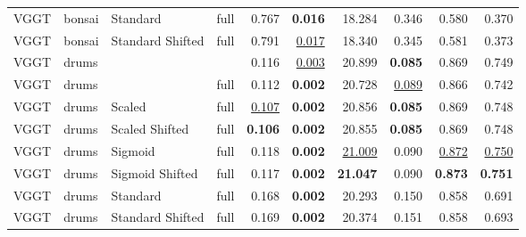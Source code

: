 \begin{table}[H]
\begin{tabular}{llllrrrrrr}
VGGT & bonsai & Standard & full & 0.767 & \textbf{0.016} & 18.284 & 0.346 & 0.580 & 0.370 \\
VGGT & bonsai & Standard Shifted & full & 0.791 & \underline{0.017} & 18.340 & 0.345 & 0.581 & 0.373 \\
\midrule
VGGT & drums &  &  & 0.116 & \underline{0.003} & 20.899 & \textbf{0.085} & 0.869 & 0.749 \\
VGGT & drums &  & full & 0.112 & \textbf{0.002} & 20.728 & \underline{0.089} & 0.866 & 0.742 \\
VGGT & drums & Scaled & full & \underline{0.107} & \textbf{0.002} & 20.856 & \textbf{0.085} & 0.869 & 0.748 \\
VGGT & drums & Scaled Shifted & full & \textbf{0.106} & \textbf{0.002} & 20.855 & \textbf{0.085} & 0.869 & 0.748 \\
VGGT & drums & Sigmoid & full & 0.118 & \textbf{0.002} & \underline{21.009} & 0.090 & \underline{0.872} & \underline{0.750} \\
VGGT & drums & Sigmoid Shifted & full & 0.117 & \textbf{0.002} & \textbf{21.047} & 0.090 & \textbf{0.873} & \textbf{0.751} \\
VGGT & drums & Standard & full & 0.168 & \textbf{0.002} & 20.293 & 0.150 & 0.858 & 0.691 \\
VGGT & drums & Standard Shifted & full & 0.169 & \textbf{0.002} & 20.374 & 0.151 & 0.858 & 0.693 \\
\bottomrule
\end{tabular}
\end{table}